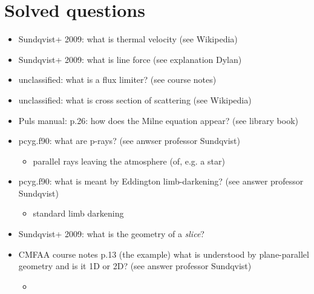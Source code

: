 \documentclass[../main/main.tex]{subfiles}
\begin{document}
\section{Solved questions}
\begin{itemize}
\item Sundqvist+ 2009: what is thermal velocity (see Wikipedia)
\item Sundqvist+ 2009: what is line force (see explanation Dylan)
\item unclassified: what is a flux limiter? (see course notes)
\item unclassified: what is cross section of scattering (see Wikipedia)
\item Puls manual: p.26: how does the Milne equation appear? (see library book)

\item pcyg.f90: what are p-rays? (see anwser professor Sundqvist)
\begin{itemize}
\item parallel rays leaving the atmosphere (of, e.g. a star)
\begin{center}
\end{center}
\end{itemize}  

\item pcyg.f90: what is meant by Eddington limb-darkening? (see answer professor Sundqvist)
\begin{itemize}
\item standard limb darkening
\end{itemize}
\item Sundqvist+ 2009: what is the geometry of a \textit{slice}?

\item CMFAA course notes p.13 (the example) what is understood by plane-parallel geometry and is it 1D or 2D? (see answer professor Sundqvist)
\begin{itemize}
\item 
\end{itemize}


\end{itemize}
\end{document}
